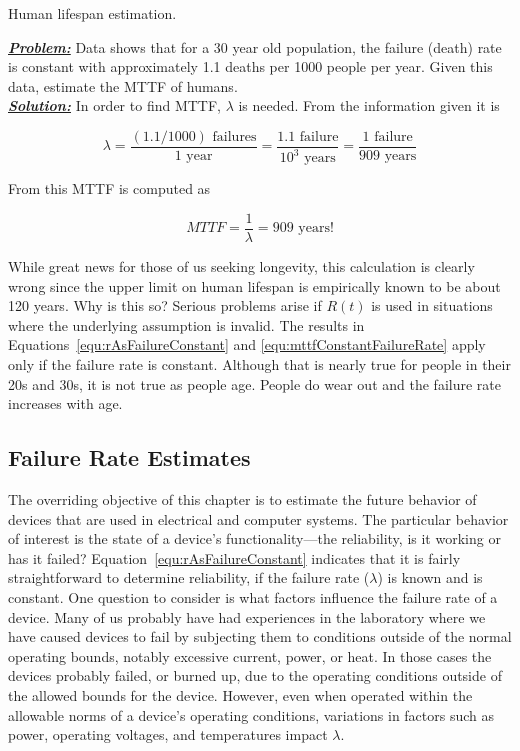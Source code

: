 {\begin{example}{Human lifespan estimation.}
\label{example:systemReliabilityHumanLifeSpan}

\emph{\textbf{\ul{Problem:}}} Data shows that for a 30 year old
population, the failure (death) rate is constant with approximately 1.1
deaths per 1000 people per year. Given this data, estimate the MTTF of
humans.\\

\noindent\emph{\textbf{\ul{Solution:}}} In order to find MTTF, $\lambda$ is 
needed. From the information given it is

$$\lambda = \frac{(1.1/1000) \text{ failures}}{1 \text{ year}} = \frac{1.1 \text{ failure}}{10^3 \text{ years}}=\frac{1 \text{ failure}}{909 \text{ years}}$$

From this MTTF is computed as

$$MTTF  = \frac{1}{\lambda} = 909 \text{ years!}$$
\end {example}


While great news for those of us seeking longevity, this calculation is
clearly wrong since the upper limit on human lifespan is empirically
known to be about 120 years. Why is this so? Serious problems arise if
$R(t)$ is used in situations where the underlying assumption is
invalid. The results in Equations~\ref{equ:rAsFailureConstant} and 
\ref{equ:mttfConstantFailureRate} apply only if the failure rate is
constant. Although that is nearly true for people in their 20s and 30s,
it is not true as people age. People do wear out and the failure rate
increases with age.

\subsection{Failure Rate Estimates}
\label{subsection:failure-rate-estimates}

The overriding objective of this chapter is to estimate the future
behavior of devices that are used in electrical and computer systems.
The particular behavior of interest is the state of a device's
functionality---the reliability, is it working or has it failed?
Equation~\ref{equ:rAsFailureConstant} indicates 
that it is fairly straightforward to determine
reliability, if the failure rate ($\lambda$) is known and is constant.
One question to consider is what factors influence the failure rate of a
device. Many of us probably have had experiences in the laboratory where
we have caused devices to fail by subjecting them to conditions outside
of the normal operating bounds, notably excessive current, power, or
heat. In those cases the devices probably failed, or burned up, due to
the operating conditions outside of the allowed bounds for the device.
However, even when operated within the allowable norms of a device's
operating conditions, variations in factors such as power, operating
voltages, and temperatures impact $\lambda$.

}
